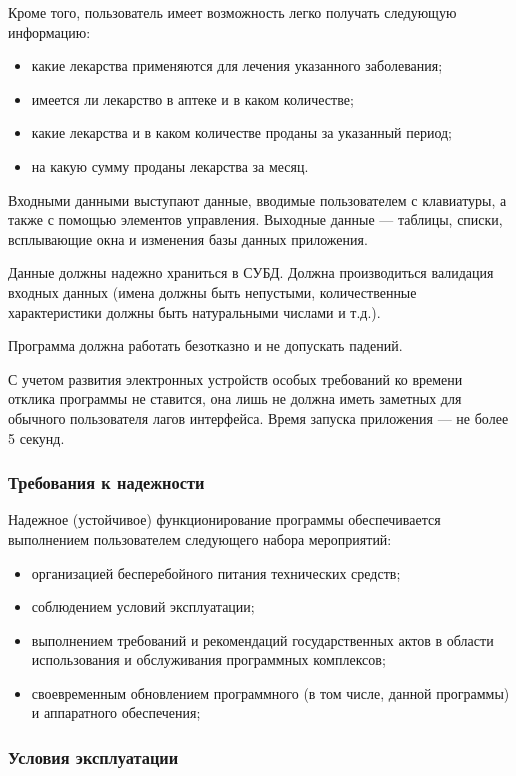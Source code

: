 Кроме того, пользователь имеет возможность легко получать следующую
информацию:
\begin{itemize}
    \item какие лекарства применяются для лечения указанного заболевания;
    \item имеется ли лекарство в аптеке и в каком количестве;
    \item какие лекарства и в каком количестве проданы за указанный период;
    \item на какую сумму проданы лекарства за месяц.
\end{itemize}

Входными данными выступают данные, вводимые пользователем с клавиатуры, а также
с помощью элементов управления. Выходные данные --- таблицы, списки,
всплывающие окна и  изменения базы данных приложения.

Данные должны надежно храниться в СУБД. Должна производиться валидация входных
данных (имена должны быть непустыми, количественные характеристики должны быть
натуральными числами и т.д.).

Программа должна работать безотказно и не допускать падений.

С учетом развития электронных устройств особых требований ко времени отклика
программы не ставится, она лишь не должна иметь заметных для обычного
пользователя лагов интерфейса. Время запуска приложения --- не более 5 секунд.

\subsubsection{Требования к надежности}

Надежное (устойчивое) функционирование программы обеспечивается выполнением
пользователем следующего набора мероприятий:
\begin{itemize}
    \item организацией бесперебойного питания технических средств;
    \item соблюдением условий эксплуатации;
    \item выполнением требований и рекомендаций государственных актов в области
        использования и обслуживания программных комплексов;
    \item своевременным обновлением программного (в том числе, данной
        программы) и аппаратного обеспечения;
\end{itemize}

\subsubsection{Условия эксплуатации}

